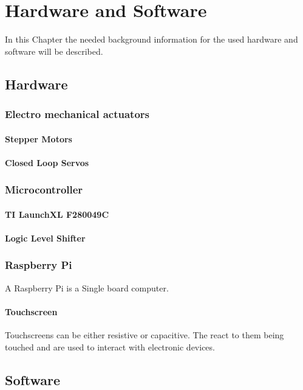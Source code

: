 \chapter{Hardware and Software}
\label{hardwareandsoftware}

In this Chapter the needed background information for the used hardware and software will be described.

\section{Hardware}
\subsection{Electro mechanical actuators}
\subsubsection{Stepper Motors}
\subsubsection{Closed Loop Servos}

\subsection{Microcontroller}
\subsubsection{TI LaunchXL F280049C}
\subsubsection{Logic Level Shifter}

\subsection{Raspberry Pi}
A Raspberry Pi is a Single board computer.
\subsubsection{Touchscreen}
Touchscreens can be either resistive or capacitive. The react to them being touched and are used to interact with electronic devices.

\section{Software}
